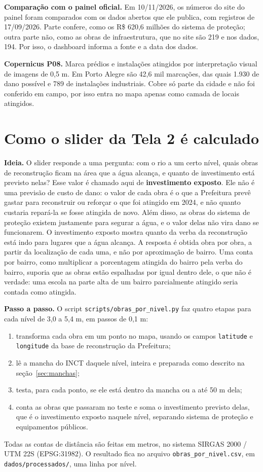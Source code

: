 \documentclass[11pt,a4paper]{article}
\newcommand{\campo}[1]{\texttt{#1}}
\begin{document}
\textbf{Comparação com o painel oficial.} Em 10/11/2026, os números do site do painel foram comparados com os dados abertos que ele publica, com registros de 17/09/2026. Parte confere, como os R\$ 620,6 milhões do sistema de proteção; outra parte não, como as obras de infraestrutura, que no site são 219 e nos dados, 194. Por isso, o dashboard informa a fonte e a data dos dados.

\textbf{Copernicus P08.} Marca prédios e instalações atingidos por interpretação visual de imagens de 0,5 m. Em Porto Alegre são 42,6 mil marcações, das quais 1.930 de dano possível e 789 de instalações industriais. Cobre só parte da cidade e não foi conferido em campo, por isso entra no mapa apenas como camada de locais atingidos.

\section{Como o slider da Tela 2 é calculado}
\label{sec:slider}

\textbf{Ideia.} O slider responde a uma pergunta: com o rio a um certo nível, quais obras de reconstrução ficam na área que a água alcança, e quanto de investimento está previsto nelas? Esse valor é chamado aqui de \textbf{investimento exposto}. Ele não é uma previsão de custo de dano: o valor de cada obra é o que a Prefeitura prevê gastar para reconstruir ou reforçar o que foi atingido em 2024, e não quanto custaria repará-la se fosse atingida de novo. Além disso, as obras do sistema de proteção existem justamente para segurar a água, e o valor delas não vira dano se funcionarem. O investimento exposto mostra quanto da verba da reconstrução está indo para lugares que a água alcança. A resposta é obtida obra por obra, a partir da localização de cada uma, e não por aproximação de bairro. Uma conta por bairro, como multiplicar a porcentagem atingida do bairro pela verba do bairro, suporia que as obras estão espalhadas por igual dentro dele, o que não é verdade: uma escola na parte alta de um bairro parcialmente atingido seria contada como atingida.

\textbf{Passo a passo.} O script \campo{scripts/obras\_por\_nivel.py} faz quatro etapas para cada nível de 3,0 a 5,4 m, em passos de 0,1 m:
\begin{enumerate}
\item transforma cada obra em um ponto no mapa, usando os campos \campo{latitude} e \campo{longitude} da base de reconstrução da Prefeitura;
\item lê a mancha do INCT daquele nível, inteira e preparada como descrito na seção~\ref{sec:manchas};
\item testa, para cada ponto, se ele está dentro da mancha ou a até 50 m dela;
\item conta as obras que passaram no teste e soma o investimento previsto delas, que é o investimento exposto naquele nível, separando sistema de proteção e equipamentos públicos.
\end{enumerate}
Todas as contas de distância são feitas em metros, no sistema SIRGAS 2000 / UTM 22S (EPSG:31982). O resultado fica no arquivo \campo{obras\_por\_nivel.csv}, em \campo{dados/processados/}, uma linha por nível.
\end{document}
